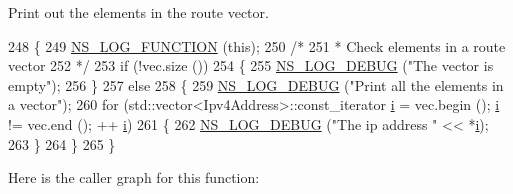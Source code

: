 Print out the elements in the route vector. 


\begin{DoxyCode}
248 \{
249   \hyperlink{log-macros-disabled_8h_a90b90d5bad1f39cb1b64923ea94c0761}{NS\_LOG\_FUNCTION} (\textcolor{keyword}{this});
250   \textcolor{comment}{/*}
251 \textcolor{comment}{   * Check elements in a route vector}
252 \textcolor{comment}{   */}
253   \textcolor{keywordflow}{if} (!vec.size ())
254     \{
255       \hyperlink{group__logging_ga413f1886406d49f59a6a0a89b77b4d0a}{NS\_LOG\_DEBUG} (\textcolor{stringliteral}{"The vector is empty"});
256     \}
257   \textcolor{keywordflow}{else}
258     \{
259       \hyperlink{group__logging_ga413f1886406d49f59a6a0a89b77b4d0a}{NS\_LOG\_DEBUG} (\textcolor{stringliteral}{"Print all the elements in a vector"});
260       \textcolor{keywordflow}{for} (std::vector<Ipv4Address>::const\_iterator \hyperlink{bernuolliDistribution_8m_a6f6ccfcf58b31cb6412107d9d5281426}{i} = vec.begin (); \hyperlink{bernuolliDistribution_8m_a6f6ccfcf58b31cb6412107d9d5281426}{i} != vec.end (); ++
      \hyperlink{bernuolliDistribution_8m_a6f6ccfcf58b31cb6412107d9d5281426}{i})
261         \{
262           \hyperlink{group__logging_ga413f1886406d49f59a6a0a89b77b4d0a}{NS\_LOG\_DEBUG} (\textcolor{stringliteral}{"The ip address "} << *\hyperlink{bernuolliDistribution_8m_a6f6ccfcf58b31cb6412107d9d5281426}{i});
263         \}
264     \}
265 \}
\end{DoxyCode}


Here is the caller graph for this function\+:


